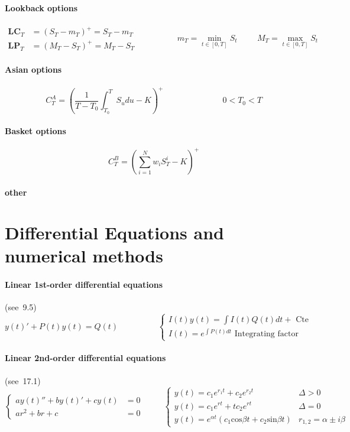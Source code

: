 \documentclass[a4paper,10pt]{article}
\begin{document}
\paragraph{Lookback options}
\[
\begin{array}{ll}
\textbf{LC}_T &= (S_T - m_T)^+ = S_T - m_T  \\
\textbf{LP}_T &= (M_T - S_T)^+ = M_T - S_T
\end{array}
\hspace{2cm}
m_T = \displaystyle\min_{t\in [0,T]} S_t  
\hspace{1cm}
M_T = \displaystyle\max_{t\in [0,T]} S_t 
\]
\paragraph{Asian options} 
\[
C^A_T = ( \frac{1}{T-T_0} \int_{T_0}^T S_udu  - K  )^+
\hspace{3cm}
0<T_0<T 
\]
\paragraph{Basket options}
\[
C_T^B = ( \sum^{N}_{i=1}  w_i S^i_T -  K)^+
\]
\paragraph{other}




\section{Differential Equations and numerical methods}
\paragraph{Linear 1st-order differential equations} (see~\cite{STEWART}9.5)
\[
y(t)' + P(t)y(t) = Q(t)
\hspace{2cm}
\left\{ 
\begin{array}{l}
I(t)y(t) = \int I(t)Q(t)dt + \text{ Cte }           \\
I(t) = e^{\int P(t)dt } \text{ Integrating factor} 
\end{array}\right. 
\]
\paragraph{Linear 2nd-order differential equations} (see~\cite{STEWART}17.1)
\[
\left\{ 
\begin{array}{rl}
ay(t)'' + by(t)' + c y(t) &= 0   \\
           ar^2 + br + c  &= 0   
\end{array}\right. 
\hspace{1cm}
\left\{ 
\begin{array}{ll}
y(t)=c_1 e^{r_1 t} + c_2 e^{r_2 t} & \Delta >0 \\
y(t)=c_1 e^{r t} + t c_2 e^{r t}   & \Delta =0 \\
y(t)=e^{\alpha t}( c_1 \text{cos}\beta t + c_2 \text{sin}\beta t ) & r_{1,2} = \alpha \pm i \beta
\end{array}\right.
\]
\end{document}
